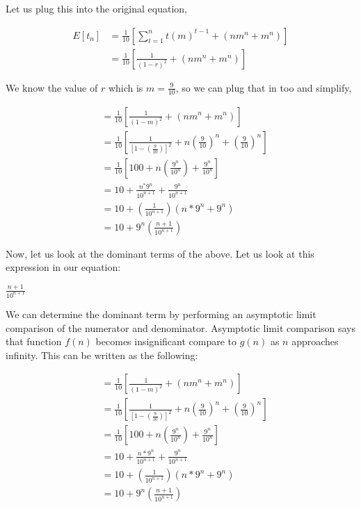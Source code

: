 \documentclass[10pt]{article}
\begin{document}
Let us plug this into the original equation,

$$
\begin{aligned}
E\left[t_{n}\right] & =\frac{1}{10}\left[\sum_{t=1}^{n} t(m)^{t-1}+\left(n m^{n}+m^{n}\right)\right] \\
& =\frac{1}{10}\left[\frac{1}{(1-r)^{2}}+\left(n m^{n}+m^{n}\right)\right]
\end{aligned}
$$

We know the value of $r$ which is $m=\frac{9}{10}$, so we can plug that in too and simplify,

$$
\begin{aligned}
& =\frac{1}{10}\left[\frac{1}{(1-m)^{2}}+\left(n m^{n}+m^{n}\right)\right] \\
& =\frac{1}{10}\left[\frac{1}{\left[1-\left(\frac{9}{10}\right)\right]^{2}}+n\left(\frac{9}{10}\right)^{n}+\left(\frac{9}{10}\right)^{n}\right] \\
& =\frac{1}{10}\left[100+n\left(\frac{9^{n}}{10^{n}}\right)+\frac{9^{n}}{10^{n}}\right] \\
& =10+\frac{n^{*} 9^{n}}{10^{n+1}}+\frac{9^{n}}{10^{n+1}} \\
& =10+\left(\frac{1}{10^{n+1}}\right)\left(n * 9^{n}+9^{n}\right) \\
& =10+9^{n}\left(\frac{n+1}{10^{n+1}}\right)
\end{aligned}
$$

Now, let us look at the dominant terms of the above. Let us look at this expression in our equation:

$\frac{n+1}{10^{n+1}}$

We can determine the dominant term by performing an asymptotic limit comparison of the numerator and denominator. Asymptotic limit comparison says that function $f(n)$ becomes insignificant compare to $g(n)$ as $n$ approaches infinity. This can be written as the following:

\begin{align*}
&= \frac{1}{10} \left[ \frac{1}{(1 - m)^2} + (nm^n + m^n) \right] \\
&= \frac{1}{10} \left[ \frac{1}{\left[1 - \left(\frac{9}{10}\right)\right]^2} + n \left(\frac{9}{10}\right)^n + \left(\frac{9}{10}\right)^n \right] \\
&= \frac{1}{10} \left[ 100 + n \left(\frac{9^n}{10^n}\right) + \frac{9^n}{10^n} \right] \\
&= 10 + \frac{n * 9^n}{10^{n+1}} + \frac{9^n}{10^{n+1}} \\
&= 10 + \left(\frac{1}{10^{n+1}}\right)(n * 9^n + 9^n) \\
&= 10 + 9^n \left(\frac{n+1}{10^{n+1}}\right)
\end{align*}
\end{document}

